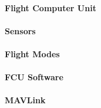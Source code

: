 \paragraph{Flight Computer Unit}
\paragraph{Sensors}
\paragraph{Flight Modes}
\paragraph{FCU Software}
\paragraph{MAVLink}




